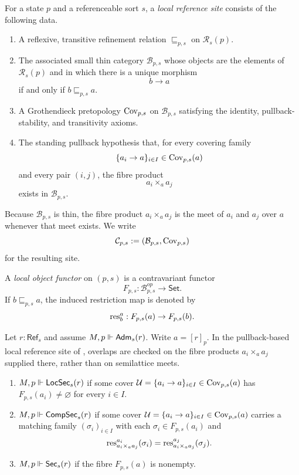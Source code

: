 \begin{definition}\label{def:local-reference-frame}
For a state $p$ and a referenceable sort $s$, a \emph{local reference site} consists of the following data.
\begin{enumerate}[label=(\roman*),nosep]
\item A reflexive, transitive refinement relation $\sqsubseteq_{p,s}$ on $\mathcal R_s(p)$.
\item The associated small thin category $\mathcal B_{p,s}$ whose objects are the elements of $\mathcal R_s(p)$ and in which there is a unique morphism
\[
b\longrightarrow a
\]
if and only if $b\sqsubseteq_{p,s} a$.
\item A Grothendieck pretopology $\mathrm{Cov}_{p,s}$ on $\mathcal B_{p,s}$ satisfying the identity, pullback-stability, and transitivity axioms.
\item The standing pullback hypothesis that, for every covering family
\[
\{a_i\to a\}_{i\in I}\in \mathrm{Cov}_{p,s}(a)
\]
and every pair $(i,j)$, the fibre product
\[
a_i\times_a a_j
\]
exists in $\mathcal B_{p,s}$.
\end{enumerate}
Because $\mathcal B_{p,s}$ is thin, the fibre product $a_i\times_a a_j$ is the meet of $a_i$ and $a_j$ over $a$ whenever that meet exists. We write
\[
\mathcal C_{p,s}:=(\mathcal B_{p,s},\mathrm{Cov}_{p,s})
\]
for the resulting site.
\end{definition}

\begin{definition}\label{def:local-object-functor}
A \emph{local object functor} on $(p,s)$ is a contravariant functor
\[
F_{p,s}:\mathcal{B}_{p,s}^{op}\to\mathsf{Set}.
\]
If $b\sqsubseteq_{p,s} a$, the induced restriction map is denoted by
\[
\mathrm{res}_b^a:F_{p,s}(a)\to F_{p,s}(b).
\]
\end{definition}

\begin{definition}\label{def:existence-levels}
Let $r:\mathsf{Ref}_s$ and assume $M,p\Vdash \mathsf{Adm}_s(r)$. Write $a=[r]_p$.
In the pullback-based local reference site of , overlaps are checked on the fibre products $a_i\times_a a_j$ supplied there, rather than on semilattice meets.
\begin{enumerate}[label=(\roman*),nosep]
\item $M,p\Vdash \mathsf{LocSec}_s(r)$ if some cover $\mathcal U=\{a_i\to a\}_{i\in I}\in\mathrm{Cov}_{p,s}(a)$ has $F_{p,s}(a_i)\neq\varnothing$ for every $i\in I$.
\item $M,p\Vdash \mathsf{CompSec}_s(r)$ if some cover $\mathcal U=\{a_i\to a\}_{i\in I}\in\mathrm{Cov}_{p,s}(a)$ carries a matching family $(\sigma_i)_{i\in I}$ with each $\sigma_i\in F_{p,s}(a_i)$ and
\[
\mathrm{res}_{a_i\times_a a_j}^{a_i}(\sigma_i)=\mathrm{res}_{a_i\times_a a_j}^{a_j}(\sigma_j).
\]
\item $M,p\Vdash \mathsf{Sec}_s(r)$ if the fibre $F_{p,s}(a)$ is nonempty.
\end{enumerate}
\end{definition}

